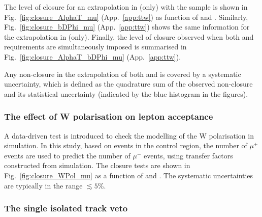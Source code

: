 The level of closure for an extrapolation in \alphat (only) with the
\mj sample is shown in Fig.~\ref{fig:closure_AlphaT_mu}
(App.~\ref{app:ttw}) as function of \scalht and \njet. Similarly,
Fig.~\ref{fig:closure_bDPhi_mu} (App.~\ref{app:ttw}) shows the same
information for the extrapolation in \bdphi (only). Finally, the level
of closure observed when both \alphat and \bdphi requirements are
simultaneously imposed is summarised in
Fig.~\ref{fig:closure_AlphaT_bDPhi_mu} (App.~\ref{app:ttw}).

Any non-closure in the extrapolation of both \alphat and \bdphi is
covered by a systematic uncertainty, which is defined as the
quadrature sum of the observed non-closure and its statistical
uncertainty (indicated by the blue histogram in the figures). 


\subsubsection{The effect of W polarisation on lepton acceptance}
\label{sec:tfSyst_Wpol}

A data-driven test is introduced to check the modelling of the W
polarisation in simulation.  In this study, based on events in the \mj
control region, the number of $\mu^{+}$ events are used to predict the
number of $\mu^{-}$ events, using transfer factors constructed from
simulation. 
The closure tests are shown in Fig.~\ref{fig:closure_WPol_mu} as a
function of \scalht and \njet. The systematic uncertainties are
typically in the range $\lesssim 5\%$.

\subsubsection{The single isolated track veto}
\label{sec:tfSyst_SITV}


